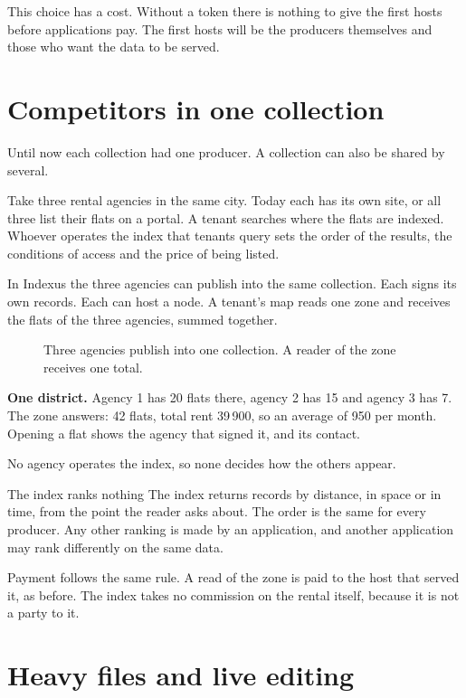 \documentclass[11pt]{article}
\newcommand{\fig}[4][]{\begin{figure}[H]\centering\vspace{0.3em}\ixnew{figures/#2.tikz}\caption{#3}\label{fig:#4}\end{figure}}
\begin{document}
This choice has a cost. Without a token there is nothing to give the first hosts before applications pay. The first hosts will be the producers themselves and those who want the data to be served.

\section{Competitors in one collection}

Until now each collection had one producer. A collection can also be shared by several.

Take three rental agencies in the same city. Today each has its own site, or all three list their flats on a portal. A tenant searches where the flats are indexed. Whoever operates the index that tenants query sets the order of the results, the conditions of access and the price of being listed.

In Indexus the three agencies can publish into the same collection. Each signs its own records. Each can host a node. A tenant's map reads one zone and receives the flats of the three agencies, summed together.

\fig{agencies}{Three agencies publish into one collection. A reader of the zone receives one total.}{agencies}

\begin{example}
\textbf{One district.} Agency 1 has 20 flats there, agency 2 has 15 and agency 3 has 7. The zone answers: 42 flats, total rent 39\,900, so an average of 950 per month. Opening a flat shows the agency that signed it, and its contact.
\end{example}

No agency operates the index, so none decides how the others appear.

\begin{guarantee}{The index ranks nothing}
The index returns records by distance, in space or in time, from the point the reader asks about. The order is the same for every producer. Any other ranking is made by an application, and another application may rank differently on the same data.
\end{guarantee}

Payment follows the same rule. A read of the zone is paid to the host that served it, as before. The index takes no commission on the rental itself, because it is not a party to it.

\section{Heavy files and live editing}
\end{document}
